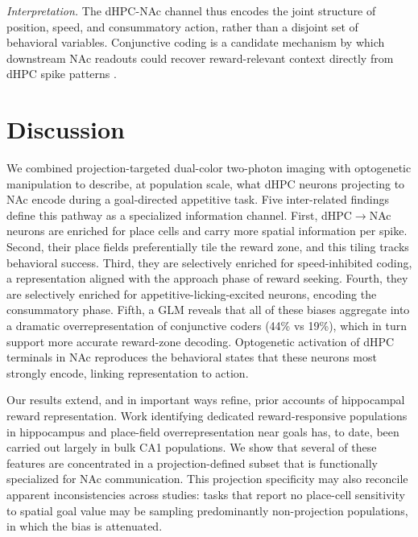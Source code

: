 \documentclass[11pt]{article}
\begin{document}
\textit{Interpretation.} The dHPC-NAc channel thus encodes the joint structure of position, speed, and consummatory action, rather than a disjoint set of behavioral variables. Conjunctive coding is a candidate mechanism by which downstream NAc readouts could recover reward-relevant context directly from dHPC spike patterns \citep{Xiao2020Conjunctive,Sato2020Overrepresentation}.



\section{Discussion}

We combined projection-targeted dual-color two-photon imaging with optogenetic manipulation to describe, at population scale, what dHPC neurons projecting to NAc encode during a goal-directed appetitive task. Five inter-related findings define this pathway as a specialized information channel. First, dHPC$\rightarrow$NAc neurons are enriched for place cells and carry more spatial information per spike. Second, their place fields preferentially tile the reward zone, and this tiling tracks behavioral success. Third, they are selectively enriched for speed-inhibited coding, a representation aligned with the approach phase of reward seeking. Fourth, they are selectively enriched for appetitive-licking-excited neurons, encoding the consummatory phase. Fifth, a GLM reveals that all of these biases aggregate into a dramatic overrepresentation of conjunctive coders (44\% vs 19\%), which in turn support more accurate reward-zone decoding. Optogenetic activation of dHPC terminals in NAc reproduces the behavioral states that these neurons most strongly encode, linking representation to action.

Our results extend, and in important ways refine, prior accounts of hippocampal reward representation. Work identifying dedicated reward-responsive populations in hippocampus \citep{Gauthier2018Reward,Sosa2018Reward} and place-field overrepresentation near goals \citep{Hok2007Goal,Mamad2017PlaceField,Sato2020Overrepresentation,Kaufman2020LocusCoeruleus} has, to date, been carried out largely in bulk CA1 populations. We show that several of these features are concentrated in a projection-defined subset that is functionally specialized for NAc communication. This projection specificity may also reconcile apparent inconsistencies across studies: tasks that report no place-cell sensitivity to spatial goal value \citep{Duvelle2019PlaceCells} may be sampling predominantly non-projection populations, in which the bias is attenuated.
\end{document}
